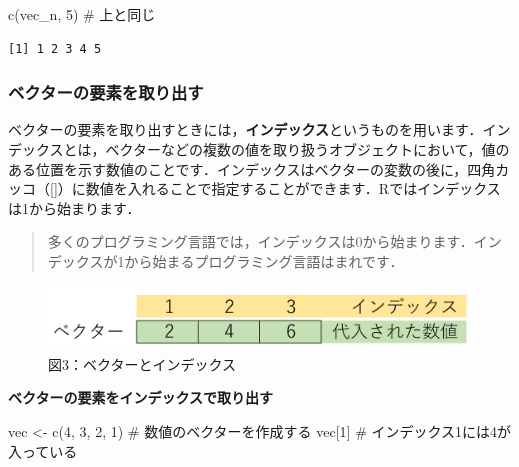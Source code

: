 \documentclass[
  letterpaper,
  DIV=11,
  numbers=noendperiod]{scrreprt}
\newenvironment{Shaded}{\begin{snugshade}}{\end{snugshade}}
\newcommand{\CommentTok}[1]{\textcolor[rgb]{0.37,0.37,0.37}{#1}}
\newcommand{\DecValTok}[1]{\textcolor[rgb]{0.68,0.00,0.00}{#1}}
\newcommand{\FunctionTok}[1]{\textcolor[rgb]{0.28,0.35,0.67}{#1}}
\newcommand{\NormalTok}[1]{\textcolor[rgb]{0.00,0.23,0.31}{#1}}
\newcommand{\OtherTok}[1]{\textcolor[rgb]{0.00,0.23,0.31}{#1}}
\begin{document}
\begin{Shaded}
\begin{Highlighting}[]
\FunctionTok{c}\NormalTok{(vec\_n, }\DecValTok{5}\NormalTok{) }\CommentTok{\# 上と同じ}
\end{Highlighting}
\end{Shaded}

\begin{verbatim}
[1] 1 2 3 4 5
\end{verbatim}

\hypertarget{ux30d9ux30afux30bfux30fcux306eux8981ux7d20ux3092ux53d6ux308aux51faux3059}{%
\subsubsection{ベクターの要素を取り出す}\label{ux30d9ux30afux30bfux30fcux306eux8981ux7d20ux3092ux53d6ux308aux51faux3059}}

ベクターの要素を取り出すときには，\textbf{インデックス}というものを用います．インデックスとは，ベクターなどの複数の値を取り扱うオブジェクトにおいて，値のある位置を示す数値のことです．インデックスはベクターの変数の後に，四角カッコ（{[}{]}）に数値を入れることで指定することができます．Rではインデックスは1から始まります．

\begin{quote}
多くのプログラミング言語では，インデックスは0から始まります．インデックスが1から始まるプログラミング言語はまれです．
\end{quote}

\begin{figure}

{\centering \includegraphics{././image/vector_index.png}

}

\caption{図3：ベクターとインデックス}

\end{figure}

\textbf{ベクターの要素をインデックスで取り出す}

\begin{Shaded}
\begin{Highlighting}[]
\NormalTok{vec }\OtherTok{\textless{}{-}} \FunctionTok{c}\NormalTok{(}\DecValTok{4}\NormalTok{, }\DecValTok{3}\NormalTok{, }\DecValTok{2}\NormalTok{, }\DecValTok{1}\NormalTok{) }\CommentTok{\# 数値のベクターを作成する}
\NormalTok{vec[}\DecValTok{1}\NormalTok{] }\CommentTok{\# インデックス1には4が入っている}
\end{Highlighting}
\end{Shaded}
\end{document}
